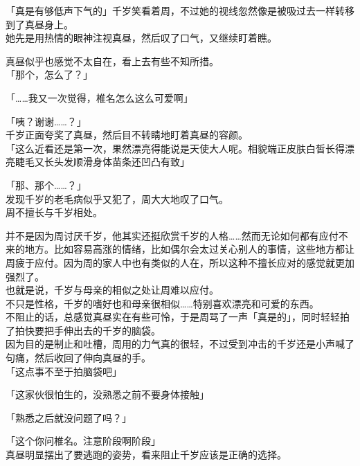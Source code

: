 「真是有够低声下气的」千岁笑看着周，不过她的视线忽然像是被吸过去一样转移到了真昼身上。\\

她先是用热情的眼神注视真昼，然后叹了口气，又继续盯着瞧。

真昼似乎也感觉不太自在，看上去有些不知所措。\\

「那个，怎么了？」

「……我又一次觉得，椎名怎么这么可爱啊」

「咦？谢谢……？」\\

千岁正面夸奖了真昼，然后目不转睛地盯着真昼的容颜。\\

「这么近看还是第一次，果然漂亮得能说是天使大人呢。相貌端正皮肤白皙长得漂亮睫毛又长头发顺滑身体苗条还凹凸有致」

「那、那个……？」\\

发现千岁的老毛病似乎又犯了，周大大地叹了口气。\\

周不擅长与千岁相处。

并不是因为周讨厌千岁，他其实还挺欣赏千岁的人格……然而无论如何都有应付不来的地方。比如容易高涨的情绪，比如偶尔会太过关心别人的事情，这些地方都让周疲于应付。因为周的家人中也有类似的人在，所以这种不擅长应对的感觉就更加强烈了。\\

也就是说，千岁与母亲的相似之处让周难以应付。\\

不只是性格，千岁的嗜好也和母亲很相似……特别喜欢漂亮和可爱的东西。\\

不阻止的话，总感觉真昼实在有些可怜，于是周骂了一声「真是的」，同时轻轻拍了拍快要把手伸出去的千岁的脑袋。\\

因为目的是制止和吐槽，周用的力气真的很轻，不过受到冲击的千岁还是小声喊了句痛，然后收回了伸向真昼的手。\\

「这点事不至于拍脑袋吧」

「这家伙很怕生的，没熟悉之前不要身体接触」

「熟悉之后就没问题了吗？」

「这个你问椎名。注意阶段啊阶段」\\

真昼明显摆出了要逃跑的姿势，看来阻止千岁应该是正确的选择。\\

